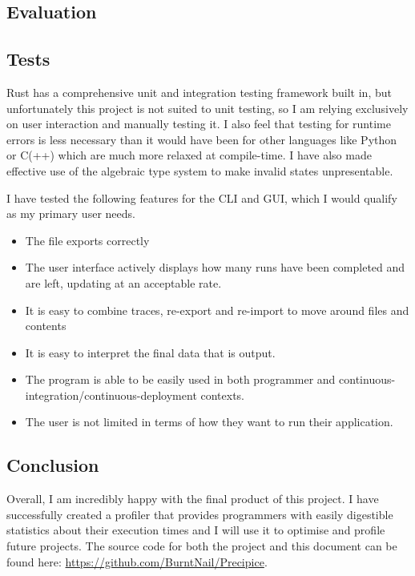 \documentclass{article}
\begin{document}
\begin{multicols*}{2}
	
\section{Evaluation}
\subsection{Tests}

Rust has a comprehensive unit and integration testing framework built in, but unfortunately this project is not suited to unit testing, so I am relying exclusively on user interaction and manually testing it. I also feel that testing for runtime errors is less necessary than it would have been for other languages like Python or C(++) which are much more relaxed at compile-time. I have also made effective use of the algebraic type system to make invalid states unpresentable.

I have tested the following features for the CLI and GUI, which I would qualify as my primary user needs.
\begin{itemize}
	\item The file exports correctly
	\item The user interface actively displays how many runs have been completed and are left, updating at an acceptable rate.
	\item It is easy to combine traces, re-export and re-import to move around files and contents
	\item It is easy to interpret the final data that is output.
	\item The program is able to be easily used in both programmer and continuous-integration/continuous-deployment contexts.
	\item The user is not limited in terms of how they want to run their application.
\end{itemize}

\subsection{Conclusion}

Overall, I am incredibly happy with the final product of this project. I have successfully created a profiler that provides programmers with easily digestible statistics about their execution times and I will use it to optimise and profile future projects. The source code for both the project and this document can be found here: \url{https://github.com/BurntNail/Precipice}.



\end{multicols*}
\end{document}
